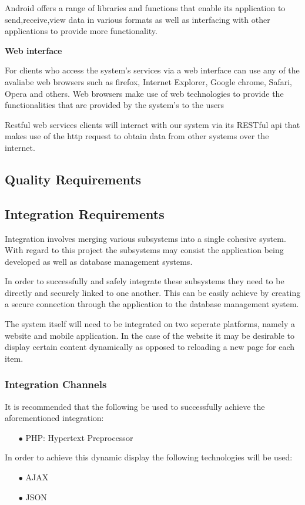 \documentclass[a4paper,12pt]{article}
\begin{document}
\begin{flushleft}
Android offers a range of libraries and functions that enable its application to send,receive,view data in various formats as well as interfacing with other applications to provide more functionality.

\textbf{Web interface} 

For clients who access the system's services via a web interface can use any of the avaliabe web browsers such as firefox, Internet Explorer, Google chrome, Safari, Opera and others. Web browsers  make use of web technologies to provide the functionalities that are provided by the system's to the users

Restful web services clients will interact with our system via its RESTful api that makes use of the http request to obtain data from other systems over the internet.
\end{flushleft}
\subsection{Quality Requirements}
\subsection{Integration Requirements}
Integration involves merging various subsystems into a single cohesive system. With regard to this project the subsystems may consist the application being developed as well as database management systems.

In order to successfully and safely integrate these subsystems they need to be directly and securely linked to one another. This can be easily achieve by creating a secure connection through the application to the database management system. 

The system itself will need to be integrated on two seperate platforms, namely a website and mobile application. In the case of the website it may be desirable to display certain content dynamically as opposed to reloading a new page for each item.

\subsubsection{Integration Channels}
It is recommended that the following be used to successfully achieve the aforementioned integration:
\begin{itemize}
	\item[$\bullet$]PHP: Hypertext Preprocessor
\end{itemize}
In order to achieve this dynamic display the following technologies will be used:
 \begin{itemize}
	\item[$\bullet$]AJAX
	\item[$\bullet$]JSON
\end{itemize}
\end{document}
